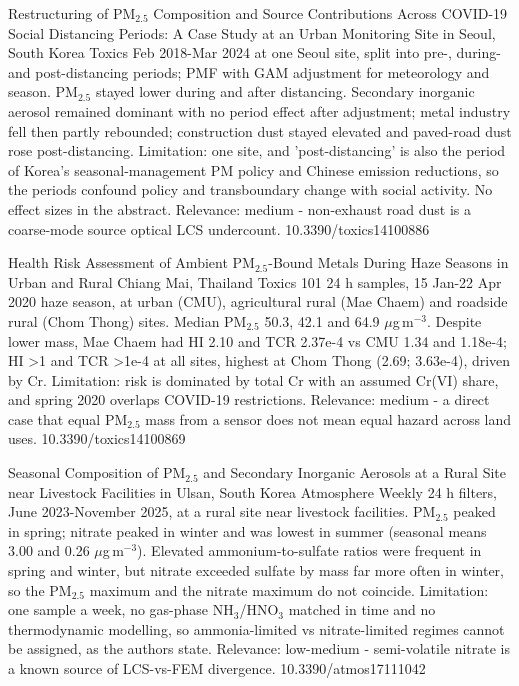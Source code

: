 \documentclass[10pt]{article}
\begin{document}
{Restructuring of PM$_{2.5}$ Composition and Source Contributions Across COVID-19 Social Distancing Periods: A Case Study at an Urban Monitoring Site in Seoul, South Korea}
{Toxics}
{Feb 2018-Mar 2024 at one Seoul site, split into pre-, during- and post-distancing periods; PMF with GAM adjustment for meteorology and season. PM$_{2.5}$ stayed lower during and after distancing. Secondary inorganic aerosol remained dominant with no period effect after adjustment; metal industry fell then partly rebounded; construction dust stayed elevated and paved-road dust rose post-distancing. Limitation: one site, and 'post-distancing' is also the period of Korea's seasonal-management PM policy and Chinese emission reductions, so the periods confound policy and transboundary change with social activity. No effect sizes in the abstract. Relevance: medium - non-exhaust road dust is a coarse-mode source optical LCS undercount.}
{10.3390/toxics14100886}

{Health Risk Assessment of Ambient PM$_{2.5}$-Bound Metals During Haze Seasons in Urban and Rural Chiang Mai, Thailand}
{Toxics}
{101 24 h samples, 15 Jan-22 Apr 2020 haze season, at urban (CMU), agricultural rural (Mae Chaem) and roadside rural (Chom Thong) sites. Median PM$_{2.5}$ 50.3, 42.1 and 64.9 $\mu$g\,m$^{-3}$. Despite lower mass, Mae Chaem had HI 2.10 and TCR 2.37e-4 vs CMU 1.34 and 1.18e-4; HI >1 and TCR >1e-4 at all sites, highest at Chom Thong (2.69; 3.63e-4), driven by Cr. Limitation: risk is dominated by total Cr with an assumed Cr(VI) share, and spring 2020 overlaps COVID-19 restrictions. Relevance: medium - a direct case that equal PM$_{2.5}$ mass from a sensor does not mean equal hazard across land uses.}
{10.3390/toxics14100869}

{Seasonal Composition of PM$_{2.5}$ and Secondary Inorganic Aerosols at a Rural Site near Livestock Facilities in Ulsan, South Korea}
{Atmosphere}
{Weekly 24 h filters, June 2023-November 2025, at a rural site near livestock facilities. PM$_{2.5}$ peaked in spring; nitrate peaked in winter and was lowest in summer (seasonal means 3.00 and 0.26 $\mu$g\,m$^{-3}$). Elevated ammonium-to-sulfate ratios were frequent in spring and winter, but nitrate exceeded sulfate by mass far more often in winter, so the PM$_{2.5}$ maximum and the nitrate maximum do not coincide. Limitation: one sample a week, no gas-phase NH$_3$/HNO$_3$ matched in time and no thermodynamic modelling, so ammonia-limited vs nitrate-limited regimes cannot be assigned, as the authors state. Relevance: low-medium - semi-volatile nitrate is a known source of LCS-vs-FEM divergence.}
{10.3390/atmos17111042}
\end{document}

